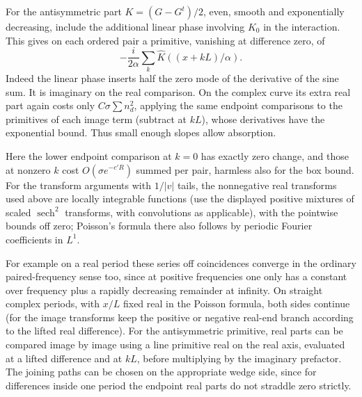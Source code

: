 For the antisymmetric part \(K=(G-G^t)/2\), even, smooth and exponentially decreasing, include the additional linear phase involving \(K_0\) in the interaction. This gives on each ordered pair a primitive, vanishing at difference zero, of
\[
 -\frac{i}{2\alpha}\sum_k \widehat K((x+kL)/\alpha).
\]
Indeed the linear phase inserts half the zero mode of the derivative of the sine sum. It is imaginary on the real comparison. On the complex curve its extra real part again costs only \(C\sigma\sum n_d^2\), applying the same endpoint comparisons to the primitives of each image term (subtract at \(kL\)), whose derivatives have the exponential bound. Thus small enough slopes allow absorption.

Here the lower endpoint comparison at \(k=0\) has exactly zero change, and those at nonzero \(k\) cost \(O(\sigma e^{-c'R})\) summed per pair, harmless also for the box bound. For the transform arguments with \(1/|v|\) tails, the nonnegative real transforms used above are locally integrable functions (use the displayed positive mixtures of scaled \(\operatorname{sech}^2\) transforms, with convolutions as applicable), with the pointwise bounds off zero; Poisson's formula there also follows by periodic Fourier coefficients in \(L^1\).

For example on a real period these series off coincidences converge in the ordinary paired-frequency sense too, since at positive frequencies one only has a constant over frequency plus a rapidly decreasing remainder at infinity. On straight complex periods, with \(x/L\) fixed real in the Poisson formula, both sides continue (for the image transforms keep the positive or negative real-end branch according to the lifted real difference). For the antisymmetric primitive, real parts can be compared image by image using a line primitive real on the real axis, evaluated at a lifted difference and at \(kL\), before multiplying by the imaginary prefactor. The joining paths can be chosen on the appropriate wedge side, since for differences inside one period the endpoint real parts do not straddle zero strictly.

